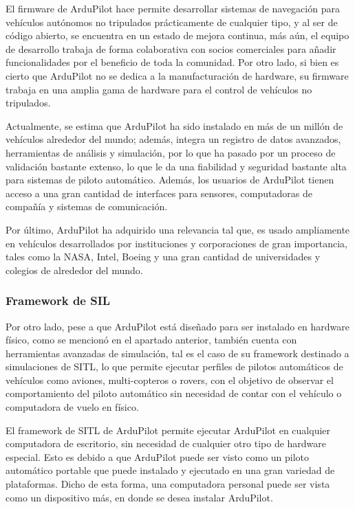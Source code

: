 El firmware de ArduPilot hace permite desarrollar sistemas de navegación para vehículos autónomos no tripulados prácticamente de cualquier tipo, y al ser de código abierto, se encuentra en un estado de mejora continua, más aún, el equipo de desarrollo trabaja de forma colaborativa con socios comerciales para añadir funcionalidades por el beneficio de toda la comunidad. Por otro lado, si bien es cierto que ArduPilot no se dedica a la manufacturación de hardware, su firmware trabaja en una amplia gama de hardware para el control de vehículos no tripulados.  

Actualmente, se estima que ArduPilot ha sido instalado en más de un millón de vehículos alrededor del mundo; además, integra un registro de datos avanzados, herramientas de análisis y simulación, por lo que ha pasado por un proceso de validación bastante extenso, lo que le da una fiabilidad y seguridad bastante alta para sistemas de piloto automático. Además, los usuarios de ArduPilot tienen acceso a una gran cantidad de interfaces para sensores, computadoras de compañía y sistemas de comunicación.

Por último, ArduPilot ha adquirido una relevancia tal que, es usado ampliamente en vehículos desarrollados por instituciones y corporaciones de gran importancia, tales como la NASA, Intel, Boeing y una gran cantidad de universidades y colegios de alrededor del mundo.

\subsubsection{Framework de SIL}

Por otro lado, pese a que ArduPilot está diseñado para ser instalado en hardware físico, como se mencionó en el apartado anterior, también cuenta con herramientas avanzadas de simulación, tal es el caso de su framework destinado a simulaciones de SITL, lo que permite ejecutar perfiles de pilotos automáticos de vehículos como aviones, multi-copteros o rovers, con el objetivo de observar el comportamiento del piloto automático sin necesidad de contar con el vehículo o computadora de vuelo en físico.

El framework de SITL de ArduPilot permite ejecutar ArduPilot en cualquier computadora de escritorio, sin necesidad de cualquier otro tipo de hardware especial. Esto es debido a que ArduPilot puede ser visto como un piloto automático portable que puede instalado y ejecutado en una gran variedad de plataformas. Dicho de esta forma, una computadora personal puede ser vista como un dispositivo más, en donde se desea instalar ArduPilot.

